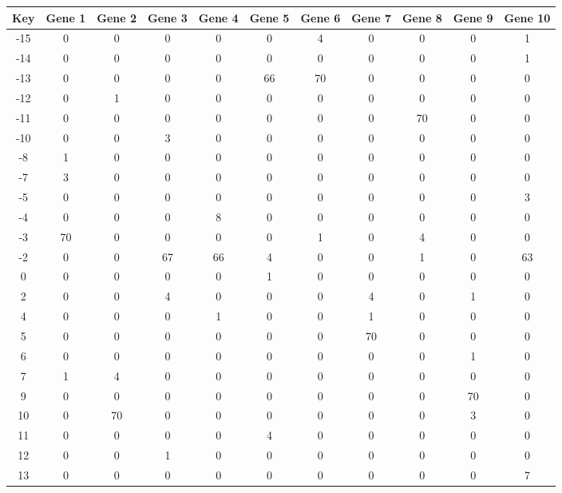 \begin{tabular}{|c|c|c|c|c|c|c|c|c|c|c|}
\hline
Key & Gene 1 & Gene 2 & Gene 3 & Gene 4 & Gene 5 & Gene 6 & Gene 7 & Gene 8 & Gene 9 & Gene 10 \\
\hline
-15 & 0 & 0 & 0 & 0 & 0 & 4 & 0 & 0 & 0 & 1 \\
-14 & 0 & 0 & 0 & 0 & 0 & 0 & 0 & 0 & 0 & 1 \\
-13 & 0 & 0 & 0 & 0 & 66 & 70 & 0 & 0 & 0 & 0 \\
-12 & 0 & 1 & 0 & 0 & 0 & 0 & 0 & 0 & 0 & 0 \\
-11 & 0 & 0 & 0 & 0 & 0 & 0 & 0 & 70 & 0 & 0 \\
-10 & 0 & 0 & 3 & 0 & 0 & 0 & 0 & 0 & 0 & 0 \\
-8 & 1 & 0 & 0 & 0 & 0 & 0 & 0 & 0 & 0 & 0 \\
-7 & 3 & 0 & 0 & 0 & 0 & 0 & 0 & 0 & 0 & 0 \\
-5 & 0 & 0 & 0 & 0 & 0 & 0 & 0 & 0 & 0 & 3 \\
-4 & 0 & 0 & 0 & 8 & 0 & 0 & 0 & 0 & 0 & 0 \\
-3 & 70 & 0 & 0 & 0 & 0 & 1 & 0 & 4 & 0 & 0 \\
-2 & 0 & 0 & 67 & 66 & 4 & 0 & 0 & 1 & 0 & 63 \\
0 & 0 & 0 & 0 & 0 & 1 & 0 & 0 & 0 & 0 & 0 \\
2 & 0 & 0 & 4 & 0 & 0 & 0 & 4 & 0 & 1 & 0 \\
4 & 0 & 0 & 0 & 1 & 0 & 0 & 1 & 0 & 0 & 0 \\
5 & 0 & 0 & 0 & 0 & 0 & 0 & 70 & 0 & 0 & 0 \\
6 & 0 & 0 & 0 & 0 & 0 & 0 & 0 & 0 & 1 & 0 \\
7 & 1 & 4 & 0 & 0 & 0 & 0 & 0 & 0 & 0 & 0 \\
9 & 0 & 0 & 0 & 0 & 0 & 0 & 0 & 0 & 70 & 0 \\
10 & 0 & 70 & 0 & 0 & 0 & 0 & 0 & 0 & 3 & 0 \\
11 & 0 & 0 & 0 & 0 & 4 & 0 & 0 & 0 & 0 & 0 \\
12 & 0 & 0 & 1 & 0 & 0 & 0 & 0 & 0 & 0 & 0 \\
13 & 0 & 0 & 0 & 0 & 0 & 0 & 0 & 0 & 0 & 7 \\
\hline
\end{tabular}